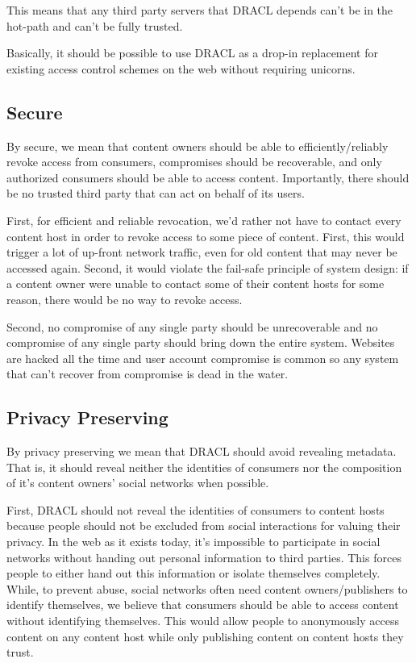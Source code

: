 \documentclass[pdftex,12pt,a4papaer]{report}
\begin{document}
This means that any third party servers that DRACL depends can't be in the
hot-path and can't be fully trusted.

Basically, it should be possible to use DRACL as a drop-in replacement for
existing access control schemes on the web without requiring unicorns.

\subsection{Secure}

By secure, we mean that content owners should be able to efficiently/reliably
revoke access from consumers, compromises should be recoverable, and only
authorized consumers should be able to access content. Importantly, there should
be no trusted third party that can act on behalf of its users.

First, for efficient and reliable revocation, we'd rather not have to contact
every content host in order to revoke access to some piece of content. First,
this would trigger a lot of up-front network traffic, even for old content that
may never be accessed again. Second, it would violate the fail-safe principle of
system design: if a content owner were unable to contact some of their content
hosts for some reason, there would be no way to revoke access.

Second, no compromise of any single party should be unrecoverable and no
compromise of any single party should bring down the entire system. Websites are
hacked all the time and user account compromise is common so any system that
can't recover from compromise is dead in the water.

\subsection{Privacy Preserving}

By privacy preserving we mean that DRACL should avoid revealing metadata. That
is, it should reveal neither the identities of consumers nor the composition of
it's content owners' social networks when possible.

First, DRACL should not reveal the identities of consumers to content hosts
because people should not be excluded from social interactions for valuing their
privacy. In the web as it exists today, it's impossible to participate in social
networks without handing out personal information to third parties. This forces
people to either hand out this information or isolate themselves completely.
While, to prevent abuse, social networks often need content owners/publishers to
identify themselves, we believe that consumers should be able to access content
without identifying themselves. This would allow people to anonymously access
content on any content host while only publishing content on content hosts they
trust.
\end{document}
